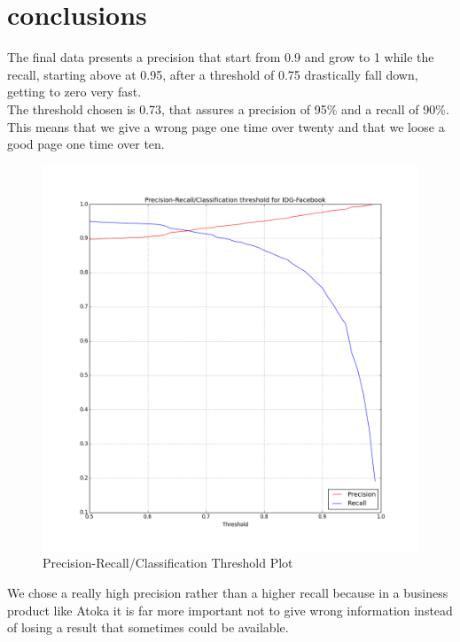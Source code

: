 \chapter{conclusions} 

The final data presents a precision that start from 0.9 and grow to 1 while the recall, starting above at 0.95, after a threshold of 0.75 drastically fall down, getting to zero very fast.\\
The threshold chosen is 0.73, that assures a precision of 95\% and a recall of 90\%. This means that we give a wrong page one time over twenty and that we loose a good page one time over ten.

\begin{figure}
\centering
    \includegraphics[width=\columnwidth]{precision_recall_curve_idg_facebook.png}
    \caption{Precision-Recall/Classification Threshold Plot}
    \label{Fig.5}
\end{figure}

We chose a really high precision rather than a higher recall because in a business product like Atoka it is far more important not to give wrong information instead of losing a result that sometimes could be available.

